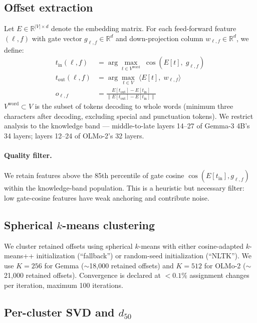 \documentclass[11pt,letterpaper]{article}
\begin{document}
\subsection{Offset extraction}

Let $E \in \mathbb{R}^{|V| \times d}$ denote the embedding matrix. For each feed-forward feature $(\ell, f)$ with gate vector $g_{\ell,f} \in \mathbb{R}^d$ and down-projection column $w_{\ell,f} \in \mathbb{R}^d$, we define:
\begin{align*}
t_{\mathrm{in}}(\ell, f) &= \arg\max_{t \in V^{\mathrm{word}}} \; \cos(E[t],\; g_{\ell,f}) \\
t_{\mathrm{out}}(\ell, f) &= \arg\max_{t \in V} \; \langle E[t],\; w_{\ell,f} \rangle \\
o_{\ell, f} &= \frac{E[t_{\mathrm{out}}] - E[t_{\mathrm{in}}]}{\|E[t_{\mathrm{out}}] - E[t_{\mathrm{in}}]\|}
\end{align*}
$V^{\mathrm{word}} \subset V$ is the subset of tokens decoding to whole words (minimum three characters after decoding, excluding special and punctuation tokens). We restrict analysis to the knowledge band --- middle-to-late layers 14--27 of Gemma-3 4B's 34 layers; layers 12--24 of OLMo-2's 32 layers.

\paragraph{Quality filter.} We retain features above the 85th percentile of gate cosine $\cos(E[t_{\mathrm{in}}], g_{\ell,f})$ within the knowledge-band population. This is a heuristic but necessary filter: low gate-cosine features have weak anchoring and contribute noise.

\subsection{Spherical $k$-means clustering}

We cluster retained offsets using spherical $k$-means with either cosine-adapted $k$-means++ initialization (``fallback'') or random-seed initialization (``NLTK''). We use $K = 256$ for Gemma ($\sim$18{,}000 retained offsets) and $K = 512$ for OLMo-2 ($\sim$21{,}000 retained offsets). Convergence is declared at $< 0.1\%$ assignment changes per iteration, maximum 100 iterations.

\subsection{Per-cluster SVD and $d_{50}$}
\end{document}

